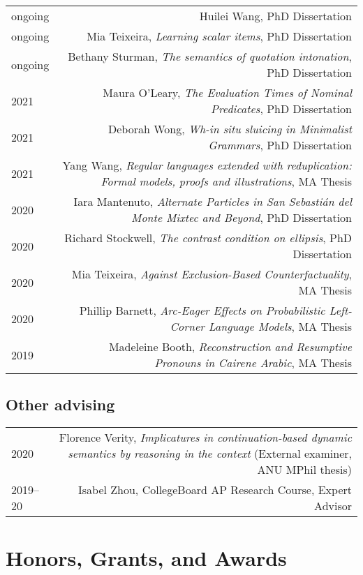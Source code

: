 \documentclass[12pt]{article}
\begin{document}
\begin{longtable}{LR}
  ongoing & Huilei Wang, PhD Dissertation\\
  ongoing & Mia Teixeira, \textit{Learning scalar items}, PhD Dissertation\\
  ongoing & Bethany Sturman, \textit{The semantics of quotation intonation}, PhD Dissertation\\
  2021    & Maura O'Leary, \textit{The Evaluation Times of Nominal Predicates}, PhD Dissertation\\
  2021    & Deborah Wong, \textit{Wh-in situ sluicing in Minimalist Grammars}, PhD Dissertation\\
  2021    & Yang Wang, \textit{Regular languages extended with reduplication:
            Formal models, proofs and illustrations}, MA Thesis\\
  2020    & Iara Mantenuto, \textit{Alternate Particles in San Sebasti\'{a}n del
            Monte Mixtec and Beyond}, PhD Dissertation\\
  2020    & Richard Stockwell, \textit{The contrast condition on ellipsis}, PhD Dissertation\\
  2020    & Mia Teixeira, \textit{Against Exclusion-Based Counterfactuality}, MA Thesis\\
  2020    & Phillip Barnett, \textit{Arc-Eager Effects on Probabilistic
            Left-Corner Language Models}, MA Thesis\\
  2019    & Madeleine Booth, \textit{Reconstruction and Resumptive Pronouns in
            Cairene Arabic}, MA Thesis
\end{longtable}

\subsection*{Other advising}

\begin{longtable}{LR}
  2020     & Florence Verity, \textit{Implicatures in continuation-based dynamic
             semantics by reasoning in the context} (External examiner, ANU MPhil
             thesis)
  \\
  2019--20 & Isabel Zhou, CollegeBoard AP Research Course, Expert Advisor
\end{longtable}


\medskip

\section*{Honors, Grants, and Awards}
\end{document}
